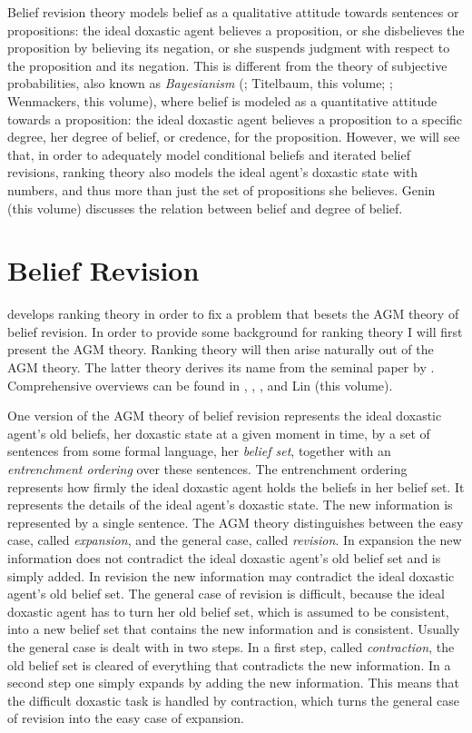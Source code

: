 Belief revision theory models belief as a qualitative attitude towards sentences or propositions: the ideal doxastic agent believes a proposition, or she disbelieves the proposition by believing its negation, or she suspends judgment with respect to the proposition and its negation. This is different from the theory of subjective probabilities, also known as \emph{Bayesianism} (\citealt{e11, e11b}; Titelbaum, this volume; \citealt{w11}; Wenmackers, this volume), where belief is modeled as a quantitative attitude towards a proposition: the ideal doxastic agent believes a proposition to a specific degree, her degree of belief, or credence, for the proposition. However, we will see that, in order to adequately model conditional beliefs and iterated belief revisions, ranking theory also models the ideal agent's doxastic state with numbers, and thus more than just the set of propositions she believes. Genin (this volume) discusses the relation between belief and degree of belief.

\section{Belief Revision}

\citet{s88,s90} develops ranking theory in order to fix a problem that besets the AGM theory of belief revision. In order to provide some background for ranking theory I will first present the AGM theory. Ranking theory will then arise naturally out of the AGM theory. The latter theory derives its name from the seminal paper by \citet{agm85}. Comprehensive overviews can be found in \citet{g88b}, \citet{gr95}, \citet{r01}, and Lin (this volume).

One version of the AGM theory of belief revision represents the ideal doxastic agent's old beliefs, her doxastic state at a given moment in time, by a set of sentences from some formal language, her \emph{belief set}, together with an \emph{entrenchment ordering} over these sentences. The entrenchment ordering represents how firmly the ideal doxastic agent holds the beliefs in her belief set. It represents the details of the ideal agent's doxastic state. The new information is represented by a single sentence. The AGM theory distinguishes between the easy case, called \emph{expansion}, and the general case, called \emph{revision}. In expansion the new information does not contradict the ideal doxastic agent's old belief set and is simply added. In revision the new information may contradict the ideal doxastic agent's old belief set. The general case of revision is difficult, because the ideal doxastic agent has to turn her old belief set, which is assumed to be consistent, into a new belief set that contains the new information and is consistent. Usually the general case is dealt with in two steps. In a first step, called \emph{contraction}, the old belief set is cleared of everything that contradicts the new information. In a second step one simply expands by adding the new information. This means that the difficult doxastic task is handled by contraction, which turns the general case of revision into the easy case of expansion.

